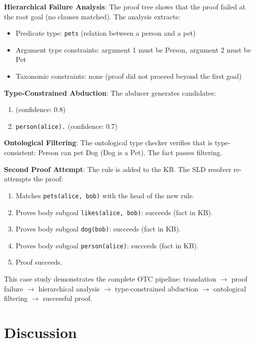 \documentclass[11pt,letterpaper]{article}
\begin{document}
\textbf{Hierarchical Failure Analysis}: The proof tree shows that the proof failed at the root goal (no clauses matched). The analysis extracts:
\begin{itemize}
    \item Predicate type: \texttt{pets} (relation between a person and a pet)
    \item Argument type constraints: argument 1 must be Person, argument 2 must be Pet
    \item Taxonomic constraints: none (proof did not proceed beyond the first goal)
\end{itemize}

\textbf{Type-Constrained Abduction}: The abducer generates candidates:
\begin{enumerate}
    \item {} (confidence: 0.8)
    \item \texttt{person(alice).} (confidence: 0.7)
\end{enumerate}

\textbf{Ontological Filtering}: The ontological type checker verifies that 
is type-consistent: Person can pet Dog (Dog is a Pet). The fact passes filtering.

\textbf{Second Proof Attempt}: The rule 
is added to the KB. The SLD resolver re-attempts the proof:
\begin{enumerate}
    \item Matches \texttt{pets(alice, bob)} with the head of the new rule.
    \item Proves body subgoal \texttt{likes(alice, bob)}: succeeds (fact in KB).
    \item Proves body subgoal \texttt{dog(bob)}: succeeds (fact in KB).
    \item Proves body subgoal \texttt{person(alice)}: succeeds (fact in KB).
    \item Proof succeeds.
\end{enumerate}

This case study demonstrates the complete OTC pipeline: translation $\rightarrow$ proof failure $\rightarrow$ hierarchical analysis $\rightarrow$ type-constrained abduction $\rightarrow$ ontological filtering $\rightarrow$ successful proof.

\section{Discussion}
\end{document}
